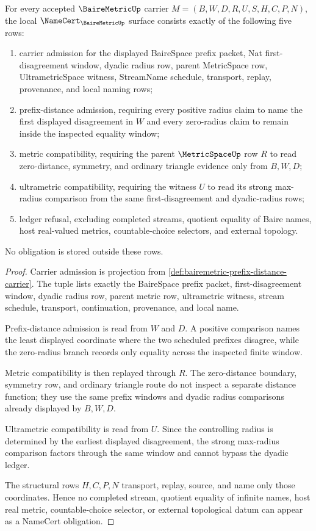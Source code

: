 \begin{theorem}
\label{thm:bairemetric-namecert-obligations}
For every accepted $\BaireMetricUp$ carrier $M=(B,W,D,R,U,S,H,C,P,N)$, the local $\NameCert_{\BaireMetricUp}$ surface consists exactly of the following five rows:
\begin{enumerate}
\item carrier admission for the displayed BaireSpace prefix packet, Nat first-disagreement window, dyadic radius row, parent MetricSpace row, UltrametricSpace witness, StreamName schedule, transport, replay, provenance, and local naming rows;
\item prefix-distance admission, requiring every positive radius claim to name the first displayed disagreement in $W$ and every zero-radius claim to remain inside the inspected equality window;
\item metric compatibility, requiring the parent $\MetricSpaceUp$ row $R$ to read zero-distance, symmetry, and ordinary triangle evidence only from $B,W,D$;
\item ultrametric compatibility, requiring the witness $U$ to read its strong max-radius comparison from the same first-disagreement and dyadic-radius rows;
\item ledger refusal, excluding completed streams, quotient equality of Baire names, host real-valued metrics, countable-choice selectors, and external topology.
\end{enumerate}
No obligation is stored outside these rows.
\end{theorem}
\begin{proof}
Carrier admission is projection from \autoref{def:bairemetric-prefix-distance-carrier}. The tuple lists exactly the BaireSpace prefix packet, first-disagreement window, dyadic radius row, parent metric row, ultrametric witness, stream schedule, transport, continuation, provenance, and local name.

Prefix-distance admission is read from $W$ and $D$. A positive comparison names the least displayed coordinate where the two scheduled prefixes disagree, while the zero-radius branch records only equality across the inspected finite window.

Metric compatibility is then replayed through $R$. The zero-distance boundary, symmetry row, and ordinary triangle route do not inspect a separate distance function; they use the same prefix windows and dyadic radius comparisons already displayed by $B,W,D$.

Ultrametric compatibility is read from $U$. Since the controlling radius is determined by the earliest displayed disagreement, the strong max-radius comparison factors through the same window and cannot bypass the dyadic ledger.

The structural rows $H,C,P,N$ transport, replay, source, and name only those coordinates. Hence no completed stream, quotient equality of infinite names, host real metric, countable-choice selector, or external topological datum can appear as a NameCert obligation.
\end{proof}


